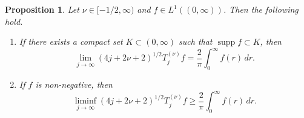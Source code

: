 \documentclass[10pt,a4paper]{amsart}
\newtheorem{proposition}{Proposition}
\newcommand{\Tjnuf}[3]{T_{#1}^{(#2)}#3}
\newcommand{\intervalco}[2]{[#1, #2)}
\newcommand{\intervaloo}[2]{(#1, #2)}
\DeclareMathOperator{\supp}{supp}
\begin{document}
\begin{proposition} \label{prop:asymptotic behavior}
Let $\nu \in \intervalco{-1/2}{\infty}$ and $f \in L^1(\intervaloo{0}{\infty})$. Then the following hold.
\begin{enumerate}[label=\textup{(\roman*)}]
\item \label{item:asymptotic behavior for compactly supported f} 
If there exists a compact set $K \subset \intervaloo{0}{\infty}$ such that $\supp f \subset K$, then
\begin{equation} \label{eq:asymptotic behavior for compactly supported f} 
	\lim_{j \to \infty} (4j+2\nu+2)^{1/2} \Tjnuf{j}{\nu}{f} = \frac{2}{\pi} \int_{0}^{\infty} f(r) \, dr .
\end{equation}
\item \label{item:asymptotic behavior for non-negative f} 
 If $f$ is non-negative, then 
\begin{equation} \label{eq:asymptotic behavior for non-negative f} 
	\liminf_{j \to \infty} (4j+2\nu+2)^{1/2} \Tjnuf{j}{\nu}{f} \geq \frac{2}{\pi} \int_{0}^{\infty} f(r) \, dr .
\end{equation}
\end{enumerate}
\end{proposition}
\end{document}
